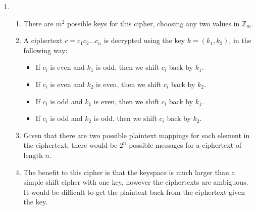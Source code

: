 \documentclass{amsart}
\begin{document}
\begin{enumerate}
\begin{enumerate}
\item
\begin{enumerate}
\item There are $m^2$ possible keys for this cipher, choosing any two values in $\mathbb{Z}_m$.
\item A ciphertext $c=c_1c_2\ldots c_n$  is decrypted using the key $k=(k_1, k_2)$, in the following way:
\begin{itemize}
\item If $c_i$ is even and $k_1$ is odd, then we shift $c_i$ back by $k_1$.
\item If $c_i$ is even and $k_2$ is even, then we shift $c_i$ back by $k_2$.
\item If $c_i$ is odd and $k_1$ is even, then we shift $c_i$ back by $k_1$.
\item If $c_i$ is odd and $k_2$ is odd, then we shift $c_i$ back by $k_2$.
\end{itemize}
\item Given that there are two possible plaintext mappings for each element in the ciphertext, there would be $2^n$ possible messages for a ciphertext of length $n$.
\item The benefit to this cipher is that the keyspace is much larger than a simple shift cipher with one key, however the ciphertexts are ambiguous.  It would be difficult to get the plaintext back from the ciphertext given the key.
\end{enumerate}
\end{enumerate}
\end{enumerate}
\end{document}
